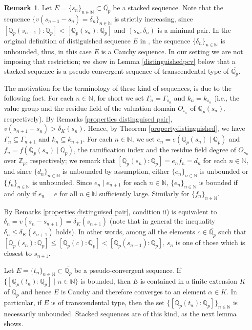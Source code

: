\documentclass[10pt]{article}
\numberwithin{equation}{section}
\theoremstyle{definition}\newtheorem{Def}[equation]{Definition}
\newtheorem{Rem}[equation]{Remark}
\theoremstyle{definition}\newtheorem{Ques}[equation]{Question}
\newcommand{\Q}{\mathbb{Q}}
\newcommand{\N}{\mathbb{N}}
\newcommand{\Z}{\mathbb{Z}}
\newcommand{\oQp}{\overline{\Q_p}}
\begin{document}
\begin{Rem}\label{pcvdist}
Let $E=\{s_n\}_{n\in\N}\subset\oQp$ be a stacked sequence. Note that the sequence $\{v(s_{n+1}-s_{n})=\delta_{n}\}_{n\in\N}$ is strictly increasing, since $[\Q_p(s_{n-1}):\Q_p]<[\Q_p(s_n):\Q_p]$ and $(s_n,\delta_n)$ is a minimal pair.   
In the original definition of distiguished sequence $E$ in \cite{APZclosed}, the sequence $\{\delta_n\}_{n\in\N}$  is   unbounded, thus, in this case   $E$ is a Cauchy sequence. In our setting we are not imposing that restriction; we show in Lemma \ref{distinguishedpcv} below that a stacked sequence is a pseudo-convergent sequence of transcendental type of $\oQp$.

The motivation for the terminology of these kind of sequences, is due to the following fact. For each $n\in\N$, for short we set $\Gamma_n=\Gamma_{s_n}$ and $k_n=k_{s_n}$ (i.e., the value group and the residue field  of the valuation domain $O_{s_n}$ of $\Q_p(s_n)$, respectively).  By Remarks \ref{properties distinguised pair}, $v(s_{n+1}-s_n)>\delta_K(s_n)$. Hence, by Theorem \ref{propertydistinguished}, we have $\Gamma_{n}\subseteq \Gamma_{n+1}$ and $k_{n}\subseteq k_{n+1}   $. For each $n\in\N$, we set $e_n=e(\Q_p(s_n)\mid\Q_p)$ and $f_n=f(\Q_p(s_n)\mid\Q_p)$, the ramification index and the residue field degree of $O_{s_n}$ over $\Z_p$, respectively; we remark that $[\Q_p(s_n):\Q_p]=e_nf_n=d_n$ for each $n\in\N$, and since $\{d_n\}_{n\in\N}$ is unbounded by assumption, either $\{e_n\}_{n\in\N}$ is unbounded or $\{f_n\}_{n\in\N}$ is unbounded. Since $e_n\mid e_{n+1}$ for each $n\in\N$, $\{e_n\}_{n\in\N}$ is bounded if and only if $e_n=e$ for all $n\in\N$ sufficiently large. Similarly for $\{f_n\}_{n\in\N}$. 

By Remarks \ref{properties distinguised pair}, condition ii) is equivalent to $\delta_n=v(s_n-s_{n+1})=\delta_K(s_{n+1})$ (note that in general the inequality $\delta_n\leq\delta_K(s_{n+1})$ holds). In other words, among all the elements $c\in\oQp$ such that $[\Q_p(s_n):\Q_p]\leq[\Q_p(c):\Q_p]<[\Q_p(s_{n+1}):\Q_p]$, $s_n$ is one of those which is closest to $s_{n+1}$. 
\end{Rem}

Let $E=\{t_n\}_{n\in\N}\subset\oQp$ be a pseudo-convergent sequence. If $\{[\Q_p(t_n):\Q_p]\mid n\in\N\}$ is bounded, then $E$ is contained in a finite extension $K$ of $\Q_p$ and hence $E$ is Cauchy and therefore converges to an element $\alpha\in K$. In particular, if $E$ is  of transcendental type, then the set $\{[\Q_p(t_n):\Q_p]\}_{n\in\N}$ is necessarily unbounded.  Stacked sequences are of this kind, as the next lemma shows.
\end{document}
